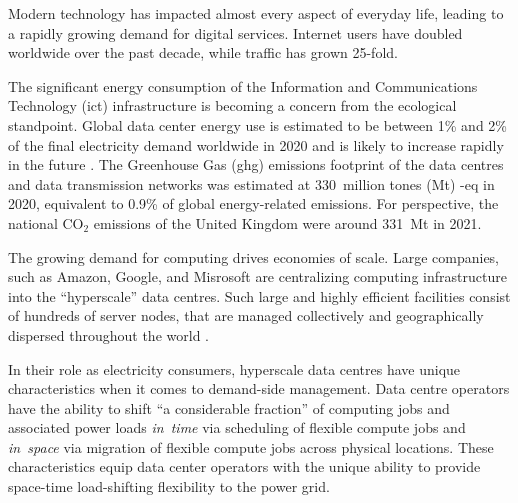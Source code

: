 %



Modern technology has impacted almost every aspect of everyday life, leading to a rapidly growing demand for digital services. Internet users have doubled worldwide over the past decade, while traffic has grown 25-fold. \cite{ieaDataCentresData2023}

The significant energy consumption of the Information and Communications Technology (\gls{ict}) infrastructure is becoming a concern from the ecological standpoint. Global data center energy use is estimated to be between 1\% and 2\% of the final electricity demand worldwide in 2020 \cite{davidmyttonHowMuchEnergy2020, masanetRecalibratingGlobalData2020} and is likely to increase rapidly in the future \cite{andraeGlobalElectricityUsage2015}. The Greenhouse Gas (\gls{ghg}) emissions footprint of the data centres and data transmission networks was estimated at 330~million tones (Mt) \co-eq in 2020, equivalent to 0.9\% of global energy-related emissions. \cite{ieaDataCentresData2023, malmodinICTSectorElectricity2023} For perspective, the national CO$_2$ emissions of the United Kingdom were around 331~Mt in 2021. \cite{UKnationalstats} 


The growing demand for computing drives economies of scale. Large companies, such as Amazon, Google, and Misrosoft are centralizing computing infrastructure into the \enquote{hyperscale} data centres. 
Such large and highly efficient facilities consist of hundreds of server nodes, that are managed collectively and geographically dispersed throughout the world \cite{ThereAre500}. 

In their role as electricity consumers, hyperscale data centres have unique characteristics when it comes to demand-side management. Data centre operators have the ability to shift \enquote{a considerable fraction} of computing jobs and associated power loads \textit{in~time} via scheduling of flexible compute jobs and \textit{in~space} via migration of flexible compute jobs across physical locations. \cite{radovanovicCarbonAwareComputingDatacenters2023} These characteristics equip data center operators with the unique ability to provide space-time load-shifting flexibility to the power grid.

